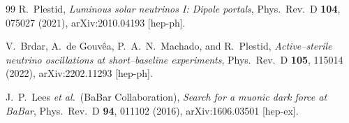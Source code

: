\begin{thebibliography}{99}
R.~Plestid,
\emph{Luminous solar neutrinos I: Dipole portals},
Phys.\ Rev.\ D \textbf{104}, 075027 (2021),
arXiv:2010.04193 [hep-ph].

V.~Brdar, A.~de Gouv\^ea, P.~A.~N.~Machado, and R.~Plestid,
\emph{Active--sterile neutrino oscillations at short--baseline
experiments},
Phys.\ Rev.\ D \textbf{105}, 115014 (2022),
arXiv:2202.11293 [hep-ph].

J.~P.~Lees \emph{et al.}\ (BaBar Collaboration),
\emph{Search for a muonic dark force at BaBar},
Phys.\ Rev.\ D \textbf{94}, 011102 (2016),
arXiv:1606.03501 [hep-ex].

\end{thebibliography}

